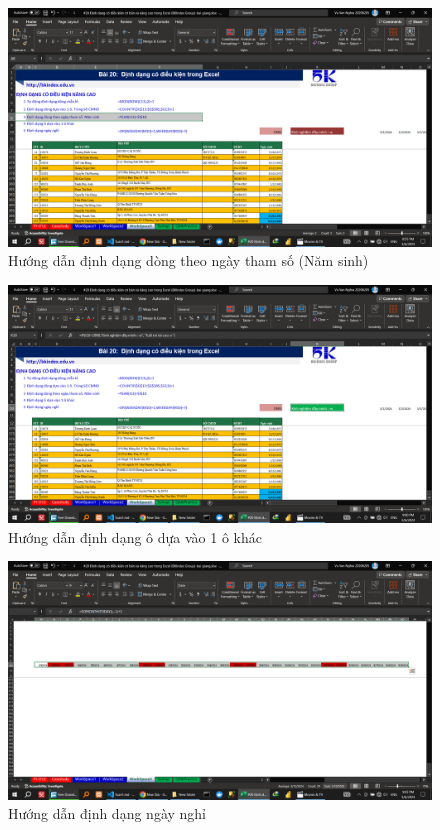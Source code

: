 \documentclass{article}
\begin{document}
\begin{figure}[H]
\centering
\includegraphics[scale = 0.15]{Video8/HuongDan/2.png}
\caption{Hướng dẫn định dạng dòng theo ngày tham số (Năm sinh)}
\end{figure}

\begin{figure}[H]
\centering
\includegraphics[scale = 0.15]{Video8/HuongDan/3.png}
\caption{Hướng dẫn định dạng ô dựa vào 1 ô khác}
\end{figure}

\begin{figure}[H]
\centering
\includegraphics[scale = 0.15]{Video8/HuongDan/4.png}
\caption{Hướng dẫn định dạng ngày nghỉ}
\end{figure}
\end{document}
